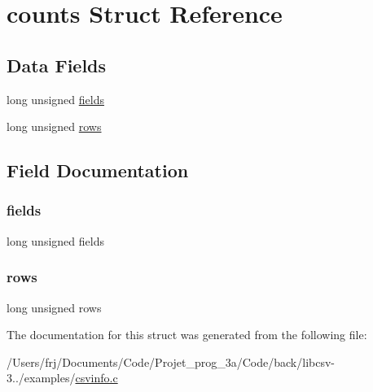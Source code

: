 \hypertarget{structcounts}{}\section{counts Struct Reference}
\label{structcounts}
\subsection*{Data Fields}
\begin{DoxyCompactItemize}
\item 
long unsigned \hyperlink{structcounts_a1d8ae28fbfc1ac4ba82db402305d9bb6}{fields}
\item 
long unsigned \hyperlink{structcounts_a5980960db5ba1fed3b570c62807238ef}{rows}
\end{DoxyCompactItemize}


\subsection{Field Documentation}
\hypertarget{structcounts_a1d8ae28fbfc1ac4ba82db402305d9bb6}{}\label{structcounts_a1d8ae28fbfc1ac4ba82db402305d9bb6} 
\subsubsection{\texorpdfstring{fields}{fields}}
{\footnotesize\ttfamily long unsigned fields}

\hypertarget{structcounts_a5980960db5ba1fed3b570c62807238ef}{}\label{structcounts_a5980960db5ba1fed3b570c62807238ef} 
\subsubsection{\texorpdfstring{rows}{rows}}
{\footnotesize\ttfamily long unsigned rows}



The documentation for this struct was generated from the following file\+:\begin{DoxyCompactItemize}
\item 
/\+Users/frj/\+Documents/\+Code/\+Projet\+\_\+prog\+\_\+3a/\+Code/back/libcsv-\/3../examples/\hyperlink{csvinfo_8c}{csvinfo.\+c}\end{DoxyCompactItemize}
